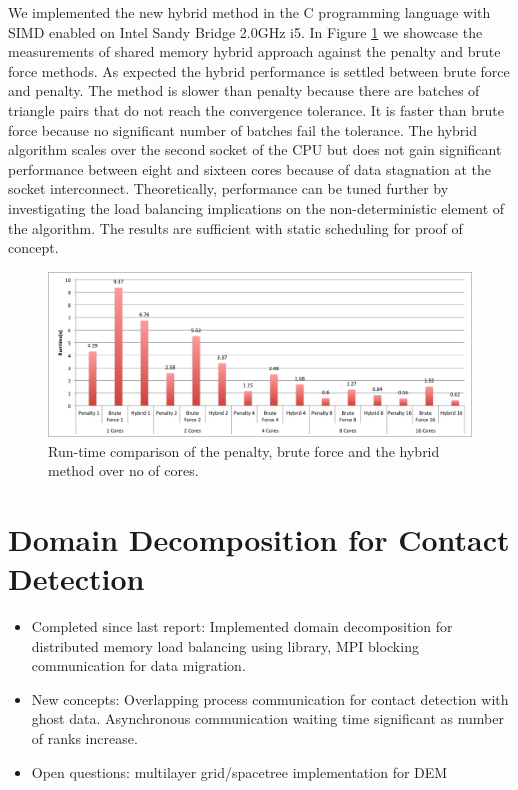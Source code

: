 \documentclass[times,12pt]{article}
\begin{document}
We implemented the new hybrid method in the C programming language with SIMD enabled on Intel Sandy Bridge 2.0GHz i5.  In Figure \ref{fig4} we showcase the measurements of shared memory hybrid approach against the penalty and brute force methods. As expected the hybrid performance is settled between brute force and penalty. The method is slower than penalty because there are batches of triangle pairs that do not reach  the convergence tolerance. It is faster than brute force because no significant number of batches fail the tolerance. The hybrid algorithm scales over the second socket of the CPU but does not gain significant performance between eight and sixteen cores because of data stagnation at the socket interconnect. Theoretically, performance can be tuned further by investigating the load balancing implications on the non-deterministic element of the algorithm. The results are sufficient with static scheduling for proof of concept.

\begin{figure}[!h]
\centering
\includegraphics[width=1\textwidth]{hybrid} \protect\caption{\label{fig4}Run-time comparison of the penalty, brute force and the hybrid method over no of cores.}
\end{figure}

\section{Domain Decomposition for Contact Detection}
\vspace{5mm}
\begin{itemize}
\item Completed since last report: Implemented domain decomposition for distributed memory load balancing using library, MPI blocking communication for data migration. 
\item New concepts: Overlapping process communication for contact detection with ghost data. Asynchronous communication waiting
time significant as number of ranks increase.
\item Open questions: multilayer grid/spacetree implementation for DEM 
\end{itemize}
\end{document}
